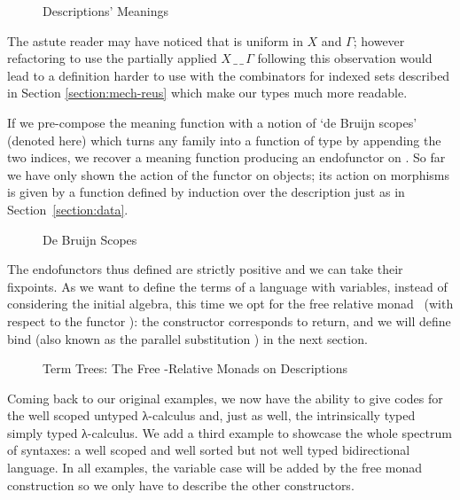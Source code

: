 \begin{figure}[h]
\caption{Descriptions' Meanings}\label{figure:syntaxmeaning}
\end{figure}

The astute reader may have noticed that  is uniform in $X$ and $\Gamma$; however
refactoring  to use the partially applied $X\,\_\,\_\,\Gamma$ following
this observation would lead to a definition harder to use with the
combinators for indexed sets described in Section \ref{section:mech-reus}
which make our types much more readable.

If we pre-compose the meaning function  with a notion of `de Bruijn scopes'
(denoted  here) which turns any   family into a function
of type      by appending the two
 indices, we recover a meaning function producing an endofunctor on
 . So far we have only shown the action of the functor on objects;
its action on morphisms is given by a function  defined by induction over
the description just as in Section~\ref{section:data}.

\begin{figure}[h]
\caption{De Bruijn Scopes}\label{figure:debruijnscope}
\end{figure}

The endofunctors thus defined are strictly positive and we can take their fixpoints.
As we want to define the terms of a language with variables, instead of
considering the initial algebra, this time we opt for the free relative
monad~\cite{JFR4389} (with respect to the functor ): the 
constructor corresponds to return, and we will define bind (also known as
the parallel substitution ) in the next section.


\begin{figure}[h]
\caption{Term Trees: The Free -Relative Monads on Descriptions}\label{figure:freemonad}
\end{figure}

Coming back to our original examples, we now have the ability to give
codes for the well scoped untyped λ-calculus and, just as well,
the intrinsically typed simply typed λ-calculus. We add a third
example to showcase the whole spectrum of syntaxes: a well scoped and
well sorted but not well typed bidirectional language. In all examples,
the variable case will be added by the free monad construction so we only
have to describe the other constructors.


